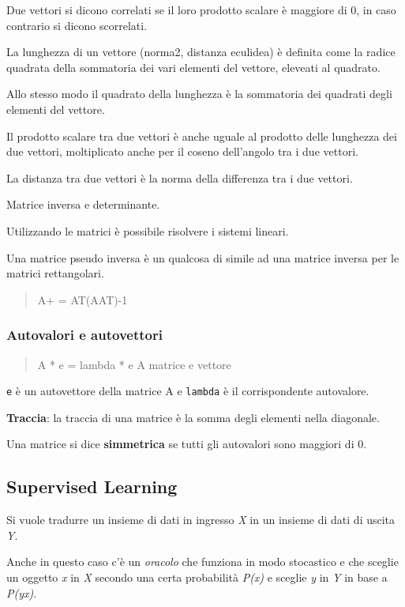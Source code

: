 Due vettori si dicono correlati se il loro prodotto scalare è maggiore
di 0, in caso contrario si dicono scorrelati.

La lunghezza di un vettore (norma2, distanza eculidea) è definita come
la radice quadrata della sommatoria dei vari elementi del vettore,
eleveati al quadrato.

Allo stesso modo il quadrato della lunghezza è la sommatoria dei
quadrati degli elementi del vettore.

Il prodotto scalare tra due vettori è anche uguale al prodotto delle
lunghezza dei due vettori, moltiplicato anche per il coseno dell'angolo
tra i due vettori.

La distanza tra due vettori è la norma della differenza tra i due
vettori.

Matrice inversa e determinante.

Utilizzando le matrici è possibile risolvere i sistemi lineari.

Una matrice pseudo inversa è un qualcosa di simile ad una matrice
inversa per le matrici rettangolari.

\begin{quote}
A+ = AT(AAT)-1
\end{quote}

\subsubsection{Autovalori e autovettori}\label{autovalori-e-autovettori}

\begin{quote}
A * e = lambda * e A matrice e vettore
\end{quote}

\texttt{e} è un autovettore della matrice A e \texttt{lambda} è il
corrispondente autovalore.

\textbf{Traccia}: la traccia di una matrice è la somma degli elementi
nella diagonale.

Una matrice si dice \textbf{simmetrica} se tutti gli autovalori sono
maggiori di 0.

\subsection{Supervised Learning}\label{supervised-learning}

Si vuole tradurre un insieme di dati in ingresso \emph{X} in un insieme di dati di uscita \emph{Y}.

Anche in questo caso c'è un \emph{oracolo} che funziona in modo stocastico e che sceglie un oggetto \emph{x} in \emph{X} secondo una certa probabilità \emph{P(x)} e sceglie \emph{y} in \emph{Y} in base a \emph{P(y\textbar{}x)}.

